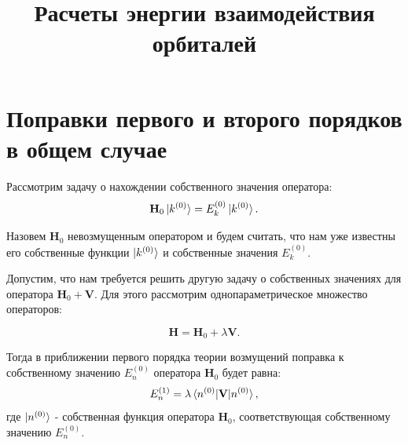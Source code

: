 \documentclass{article}
\begin{document}
\title{Расчеты энергии взаимодействия орбиталей}

\maketitle



\section{Поправки первого и второго порядков в общем случае}

Рассмотрим задачу о нахождении собственного значения оператора:
\begin{equation}
    \textbf{H}_0 \ket{k^{(0)}} = E_k^{(0)}\ket{k^{(0)}}.
\end{equation}

Назовем $\textbf{H}_0$ невозмущенным оператором и будем считать, что нам уже известны его собственные функции $\ket{k^{(0)}}$ и собственные значения $E_k^{(0)}$.

Допустим, что нам требуется решить другую задачу о собственных значениях для оператора $\textbf{H}_0 + \textbf{V}$. Для этого рассмотрим однопараметрическое множество операторов:   

\begin{equation}
    \textbf{H} = \textbf{H}_0 + \lambda \textbf{V}.
\end{equation}

Тогда в приближении первого порядка теории возмущений поправка к собственному значению $E_n^{(0)}$ оператора $\textbf{H}_0$ будет равна:
\begin{equation}
    E_n^{(1)} = \lambda \braket{n^{(0)}|\textbf{V}|n^{(0)}},
\end{equation}
где $\ket{n^{(0)}}$ - собственная функция оператора $\textbf{H}_0$, соответствующая собственному значению $E_n^{(0)}$.
\end{document}
